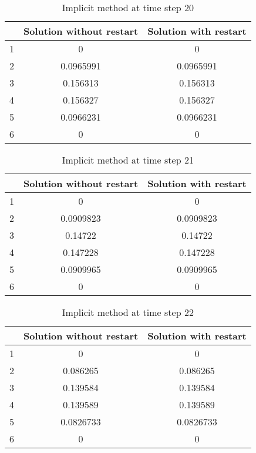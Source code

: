 \documentclass[a4paper,12pt]{article}
\begin{document}
\begin{table}[H]
\begin{center}
\begin{tabular}{ | c | c | c | }
  \hline
  & Solution without restart & Solution with restart \\
 \hline
 1  &  0 & 0     \\
  \hline
 2  &  0.0965991 & 0.0965991   \\
  \hline
 3  &  0.156313 & 0.156313   \\
  \hline
 4  &  0.156327 & 0.156327   \\
  \hline
 5  &   0.0966231& 0.0966231   \\
  \hline
 6  &   0 & 0   \\
  \hline
\end{tabular}
\end{center}
\caption{Implicit method at time step 20}
\end{table}

\begin{table}[H]
\begin{center}
\begin{tabular}{ | c | c | c | }
  \hline
  & Solution without restart & Solution with restart \\
 \hline
 1  &  0 &  0  \\
  \hline
 2  &  0.0909823 &  0.0909823  \\
  \hline
 3  &  0.14722 &  0.14722  \\
  \hline
 4  &  0.147228 &  0.147228  \\
  \hline
 5  &   0.0909965 & 0.0909965   \\
  \hline
 6  &   0 &  0  \\
  \hline
\end{tabular}
\end{center}
\caption{Implicit method at time step 21}
\end{table}

\begin{table}[H]
\begin{center}
\begin{tabular}{ | c | c | c | }
  \hline
  & Solution without restart & Solution with restart \\
 \hline
 1  &  0 & 0   \\
  \hline
 2  &  0.086265 & 0.086265   \\
  \hline
 3  &  0.139584 & 0.139584   \\
  \hline
 4  &  0.139589 &  0.139589  \\
  \hline
 5  &   0.0826733 &  0.0826733  \\
  \hline
 6  &   0 & 0   \\
  \hline
\end{tabular}
\end{center}
\caption{Implicit method at time step 22}
\end{table}
\end{document}
